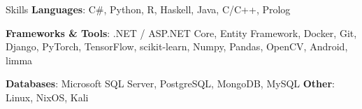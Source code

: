 \documentclass{resume} %
\begin{document}


\begin{rSection}{Skills}
\textbf{Languages}: C\#, Python, R, Haskell, Java, C/C++, Prolog

\textbf{Frameworks \& Tools}: .NET / ASP.NET Core, Entity Framework, Docker, Git, Django, PyTorch, TensorFlow, scikit-learn, Numpy, Pandas, OpenCV, Android, limma

%
\textbf{Databases}: Microsoft SQL Server, PostgreSQL, MongoDB, MySQL \quad \textbf{Other}: Linux, NixOS, Kali

\end{rSection}
\end{document}

